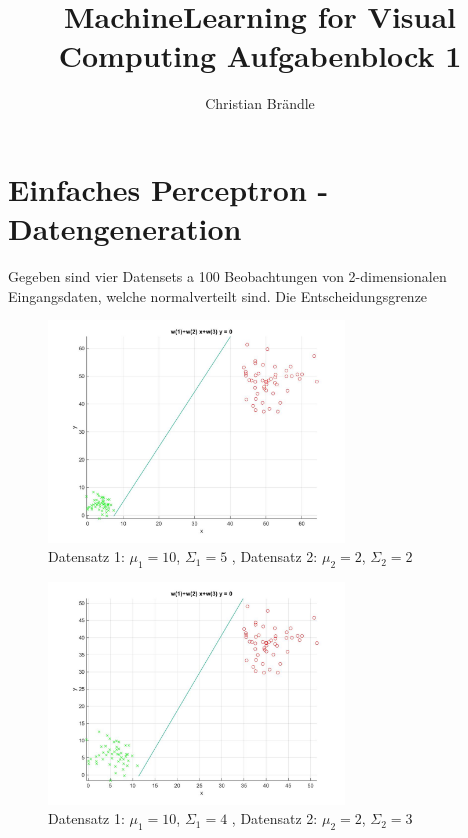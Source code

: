 \documentclass[]{report}
\title{MachineLearning for Visual Computing Aufgabenblock 1}
\author{Christian Br\"andle}
\begin{document}
\maketitle

\begin{abstract}
\end{abstract}

\section{Einfaches Perceptron - Datengeneration}


Gegeben sind vier Datensets a 100 Beobachtungen von 2-dimensionalen Eingangsdaten, welche normalverteilt sind. Die Entscheidungsgrenze 

\begin{figure}[p]
\includegraphics[width=0.7\textwidth]{./images/MyPerceptron_1.jpg}
\caption{Datensatz 1: $\mu_1=10$, $\Sigma_1=5$ , Datensatz 2: $\mu_2=2$, $\Sigma_2=2$}
\end{figure}

\begin{figure}[p]
\includegraphics[width=0.7\textwidth]{./images/MyPerceptron_2.jpg}
\caption{Datensatz 1: $\mu_1=10$, $\Sigma_1=4$ , Datensatz 2: $\mu_2=2$, $\Sigma_2=3$}
\end{figure}
\end{document}

